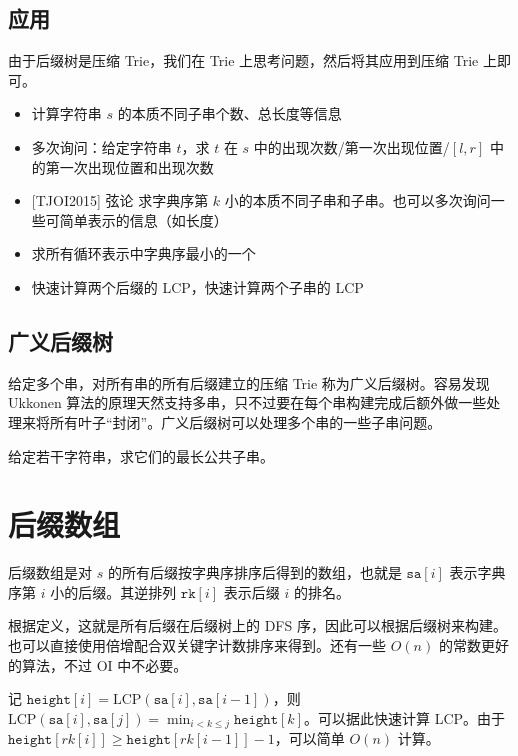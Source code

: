 \subsection{应用}

由于后缀树是压缩 Trie，我们在 Trie 上思考问题，然后将其应用到压缩 Trie 上即可。

\begin{exercise}
\begin{itemize}
    \item 计算字符串 $s$ 的本质不同子串个数、总长度等信息
    \item 多次询问：给定字符串 $t$，求 $t$ 在 $s$ 中的出现次数/第一次出现位置/$[l,r]$ 中的第一次出现位置和出现次数
    \item {[TJOI2015] 弦论} 求字典序第 $k$ 小的本质不同子串和子串。也可以多次询问一些可简单表示的信息（如长度）
    \item 求所有循环表示中字典序最小的一个
    \item 快速计算两个后缀的 LCP，快速计算两个子串的 LCP
\end{itemize}
\end{exercise}

\subsection{广义后缀树}

给定多个串，对所有串的所有后缀建立的压缩 Trie 称为广义后缀树。容易发现 Ukkonen 算法的原理天然支持多串，只不过要在每个串构建完成后额外做一些处理来将所有叶子“封闭”。广义后缀树可以处理多个串的一些子串问题。

\begin{example}
    给定若干字符串，求它们的最长公共子串。
\end{example}

\section{后缀数组}

后缀数组是对 $s$ 的所有后缀按字典序排序后得到的数组，也就是 $\mathtt{sa}[i]$ 表示字典序第 $i$ 小的后缀。其逆排列 $\mathtt{rk}[i]$ 表示后缀 $i$ 的排名。

根据定义，这就是所有后缀在后缀树上的 DFS 序，因此可以根据后缀树来构建。也可以直接使用倍增配合双关键字计数排序来得到。还有一些 $O(n)$ 的常数更好的算法，不过 OI 中不必要。

记 $\mathtt{height}[i]=\mathrm{LCP}(\mathtt{sa}[i],\mathtt{sa}[i-1])$，则 $\mathrm{LCP}(\mathtt{sa}[i],\mathtt{sa}[j]) = \min_{i<k\le j}\mathtt{height}[k]$。可以据此快速计算 LCP。由于 $\mathtt{height}[rk[i]]\ge \mathtt{height}[rk[i-1]]-1$，可以简单 $O(n)$ 计算。

